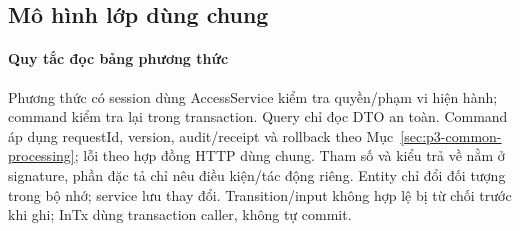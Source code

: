 \subsection{Mô hình lớp dùng chung}
\paragraph{Quy tắc đọc bảng phương thức}
Phương thức có session dùng AccessService kiểm tra quyền/phạm vi hiện hành; command kiểm tra lại trong transaction. Query chỉ đọc DTO an toàn. Command áp dụng requestId, version, audit/receipt và rollback theo Mục~\ref{sec:p3-common-processing}; lỗi theo hợp đồng HTTP dùng chung. Tham số và kiểu trả về nằm ở signature, phần đặc tả chỉ nêu điều kiện/tác động riêng. Entity chỉ đổi đối tượng trong bộ nhớ; service lưu thay đổi. Transition/input không hợp lệ bị từ chối trước khi ghi; InTx dùng transaction caller, không tự commit.
